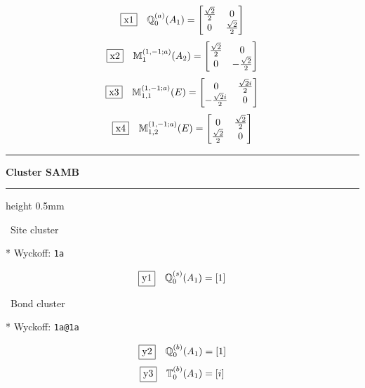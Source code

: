 \documentclass[fleqn,10pt,landscape]{jsarticle}
\begin{document}
\begin{dmath*}
\fbox{x1}\quad \mathbb{Q}_{0}^{(a)}(A_{1})=\begin{bmatrix} \frac{\sqrt{2}}{2} & 0 \\ 0 & \frac{\sqrt{2}}{2} \end{bmatrix}
\end{dmath*}
\begin{dmath*}
\fbox{x2}\quad \mathbb{M}_{1}^{(1,-1;a)}(A_{2})=\begin{bmatrix} \frac{\sqrt{2}}{2} & 0 \\ 0 & - \frac{\sqrt{2}}{2} \end{bmatrix}
\end{dmath*}
\begin{dmath*}
\fbox{x3}\quad \mathbb{M}_{1,1}^{(1,-1;a)}(E)=\begin{bmatrix} 0 & \frac{\sqrt{2} i}{2} \\ - \frac{\sqrt{2} i}{2} & 0 \end{bmatrix}
\end{dmath*}
\begin{dmath*}
\fbox{x4}\quad \mathbb{M}_{1,2}^{(1,-1;a)}(E)=\begin{bmatrix} 0 & \frac{\sqrt{2}}{2} \\ \frac{\sqrt{2}}{2} & 0 \end{bmatrix}
\end{dmath*}
\vspace{5mm}
\noindent \rule[0.5mm]{5mm}{0.5mm}\hspace{3mm}\textbf{Cluster SAMB}\hspace{3mm}\leaders\hrule height 0.5mm\hfill\kern0pt
\vspace{3mm}

\noindent\textbullet\, Site cluster

\vspace{5mm}

\noindent ** Wyckoff: \texttt{1a}

\begin{dmath*}
\fbox{y1}\quad \mathbb{Q}_{0}^{(s)}(A_{1})=\left[ 1 \right]
\end{dmath*}
\vspace{5mm}

\noindent\textbullet\, Bond cluster

\vspace{5mm}

\noindent ** Wyckoff: \texttt{1a@1a}

\begin{dmath*}
\fbox{y2}\quad \mathbb{Q}_{0}^{(b)}(A_{1})=\left[ 1 \right]
\end{dmath*}
\begin{dmath*}
\fbox{y3}\quad \mathbb{T}_{0}^{(b)}(A_{1})=\left[ i \right]
\end{dmath*}
\vspace{5mm}
\end{document}
